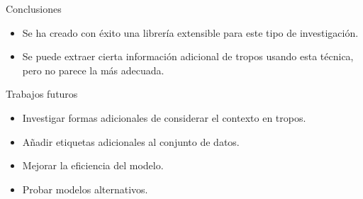 \documentclass{beamer}
\begin{document}
\begin{frame}{Conclusiones}
\begin{itemize}
	\item Se ha creado con éxito una librería extensible para este tipo de investigación.
	\item Se puede extraer cierta información adicional de tropos usando esta técnica,
	pero no parece la más adecuada.
\end{itemize}
\end{frame}

\begin{frame}{Trabajos futuros}
	\begin{itemize}
		\item Investigar formas adicionales de considerar el contexto en tropos.
		\item Añadir etiquetas adicionales al conjunto de datos.
		\item Mejorar la eficiencia del modelo.
		\item Probar modelos alternativos.
	\end{itemize}
\end{frame}
\end{document}
